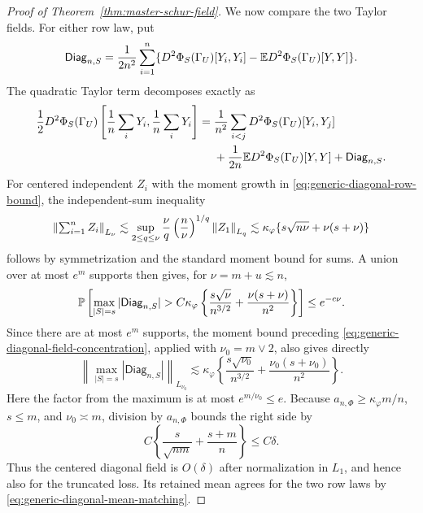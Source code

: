 \begin{proof}[Proof of Theorem~\ref{thm:master-schur-field}]
We now compare the two Taylor fields.  For either row law, put
\[
        \mathsf{Diag}_{n,S}
        =\frac1{2n^2}\sum_{i=1}^n
        \{D^2\Phi_S(\Gamma_U)[Y_i,Y_i]
        -\mathbb E D^2\Phi_S(\Gamma_U)[Y,Y]\}.
\]
The quadratic Taylor term decomposes exactly as
\begin{equation}\label{eq:generic-taylor-diagonal-split}
\begin{split}
 \frac12D^2\Phi_S(\Gamma_U)\left[\frac1n\sum_iY_i,
                         \frac1n\sum_iY_i\right]
 ={}&\frac1{n^2}\sum_{i<j}D^2\Phi_S(\Gamma_U)[Y_i,Y_j]\\
 &+\frac1{2n}\mathbb E D^2\Phi_S(\Gamma_U)[Y,Y]+\mathsf{Diag}_{n,S}.
\end{split}
\end{equation}
For centered independent $Z_i$ with the moment growth in
\eqref{eq:generic-diagonal-row-bound}, the independent-sum inequality
\[
 \left\lVert \textstyle\sum_{i=1}^n Z_i\right\rVert_{L_\nu}
 \lesssim
 \sup_{2\le q\le\nu}
 \frac\nu q\left(\frac n\nu\right)^{1/q}\left\lVert Z_1\right\rVert_{L_q}
 \lesssim \kappa_\varphi
 \{s\sqrt{n\nu}+\nu(s+\nu)\}
\]
follows by symmetrization and the standard moment bound for sums.  A
union over at most $e^m$ supports then gives, for $\nu=m+u\lesssim n$,
\begin{equation}\label{eq:generic-diagonal-field-concentration}
 \mathbb P\left[
 \max_{|S|=s}|\mathsf{Diag}_{n,S}|
 >C\kappa_\varphi
 \left\{\frac{s\sqrt\nu}{n^{3/2}}
 +\frac{\nu(s+\nu)}{n^2}\right\}
 \right]\le e^{-c\nu}.
\end{equation}
Since there are at most $e^m$ supports, the moment bound preceding
\eqref{eq:generic-diagonal-field-concentration}, applied with
$\nu_0=m\vee2$, also gives directly
\[
 \left\|\max_{|S|=s}|\mathsf{Diag}_{n,S}|\right\|_{L_{\nu_0}}
 \lesssim \kappa_\varphi
 \left\{\frac{s\sqrt{\nu_0}}{n^{3/2}}
 +\frac{\nu_0(s+\nu_0)}{n^2}\right\}.
\]
Here the factor from the maximum is at most
$e^{m/\nu_0}\le e$.  Because
$a_{n,\Phi}\ge\kappa_\varphi m/n$, $s\le m$, and
$\nu_0\asymp m$, division by $a_{n,\Phi}$ bounds the right side by
\[
 C\left\{\frac{s}{\sqrt{nm}}+\frac{s+m}{n}\right\}
 \le C\delta.
\]
Thus the centered diagonal field is $O(\delta)$ after normalization in
$L_1$, and hence also for the truncated loss.  Its retained mean agrees
for the two row laws by \eqref{eq:generic-diagonal-mean-matching}.


\end{proof}
